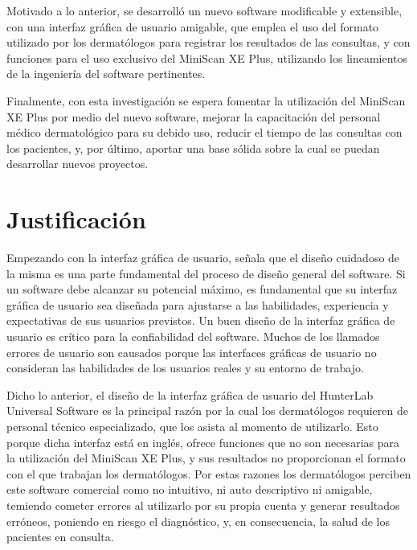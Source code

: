 Motivado a lo anterior, se desarroll\'{o} un nuevo software modificable y extensible, con una interfaz gr\'{a}fica de usuario amigable, que emplea el uso del formato utilizado por los dermat\'{o}logos para registrar los resultados de las consultas, y con funciones para el uso exclusivo del MiniScan XE Plus, utilizando los lineamientos de la ingenier\'{i}a del software pertinentes.

Finalmente, con esta investigaci\'{o}n se espera fomentar la utilizaci\'{o}n del \mbox{MiniScan} XE Plus por medio del nuevo software, mejorar la capacitaci\'{o}n del personal m\'{e}dico dermatol\'{o}gico para su debido uso, reducir el tiempo de las consultas con los pacientes, y, por \'{u}ltimo, aportar una base s\'{o}lida sobre la cual se puedan desarrollar nuevos proyectos.

	\section{Justificaci\'{o}n}
	
	Empezando con la interfaz gr\'{a}fica de usuario, \cite{Sommerville} se\~{n}ala que el dise\~{n}o cuidadoso de la misma es una parte fundamental del proceso de dise\~{n}o general del software. Si un software debe alcanzar su potencial m\'{a}ximo, es fundamental que su interfaz gr\'{a}fica de usuario sea dise\~{n}ada para ajustarse a las habilidades, experiencia y expectativas de sus usuarios previstos. Un buen dise\~{n}o de la interfaz gr\'{a}fica de usuario es cr\'{i}tico para la confiabilidad del software. Muchos de los llamados errores de usuario son causados porque las interfaces gr\'{a}ficas de usuario no consideran las habilidades de los usuarios reales y su entorno de trabajo.

	Dicho lo anterior, el dise\~{n}o de la interfaz gr\'{a}fica de usuario del HunterLab Universal Software es la principal raz\'{o}n por la cual los dermat\'{o}logos requieren de personal t\'{e}cnico especializado, que los asista al momento de utilizarlo. Esto porque dicha interfaz est\'{a} en ingl\'{e}s, ofrece funciones que no son necesarias para la utilizaci\'{o}n del MiniScan XE Plus, y sus resultados no proporcionan el formato con el que trabajan los dermat\'{o}logos. Por estas razones los dermat\'{o}logos perciben este software comercial como no intuitivo, ni auto descriptivo ni amigable, temiendo cometer errores al utilizarlo por su propia cuenta y generar resultados err\'{o}neos, poniendo en riesgo el diagn\'{o}stico, y, en consecuencia, la salud de los pacientes en consulta.

